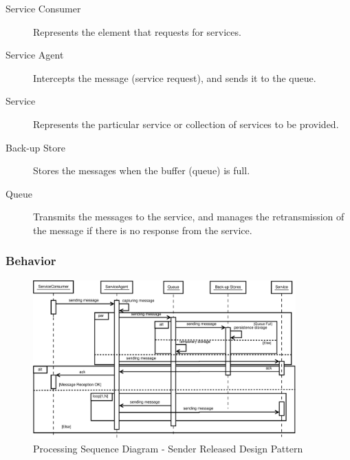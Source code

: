 \begin{description}
	
	\item[Service Consumer] 
	Represents the element that requests for services.
	
	\item[Service Agent] 
	Intercepts the message (service request), and sends it to the queue.
	
	\item[Service] 
	Represents the particular service or collection of services to be provided.
	
	\item[Back-up Store] 
	Stores the messages when the buffer (queue) is full.
	
	\item[Queue] 
	Transmits the messages to the service, and manages the retransmission of the message if there is no response from the service.
\end{description}

\subsubsection{Behavior}

\begin{figure}
	\centering
	\includegraphics*[width=0.9\textwidth, keepaspectratio=false]{fig/image15.eps}
	\caption{Processing Sequence Diagram - Sender Released Design Pattern}
	\label{fig:seq_diagram_sender}
\end{figure}


